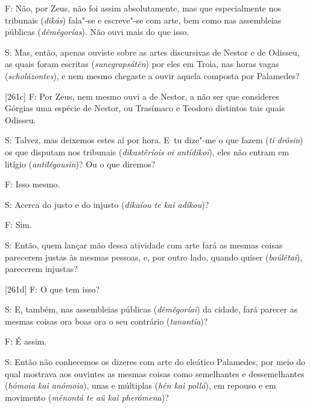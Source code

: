  

F: Não, por Zeus, não foi assim absolutamente, mas que especialmente nos
tribunais (\emph{dikás}) fala"-se e escreve"-se com arte, bem como nas
assembleias públicas (\emph{dêmêgorías}). Não ouvi mais do que isso.

 

S: Mas, então, apenas ouviste sobre as artes discursivas de Nestor e de
Odisseu, as quais foram escritas (\emph{sunegrapsátên}) por eles em
Troia, nas horas vagas (\emph{scholázontes}), e nem mesmo chegaste a
ouvir aquela composta por Palamedes?

 

[261c] F: Por Zeus, nem mesmo ouvi a de Nestor, a não ser que
consideres Górgias uma espécie de Nestor, ou Trasímaco e Teodoro
distintos tais quais Odisseu.

 

S: Talvez, mas deixemos estes aí por hora. E~tu dize"-me o que fazem
(\emph{tí drôsin}) os que disputam nos tribunais (\emph{dikastêríois oi
antídikoi}), eles não entram em litígio (\emph{antilégousin})? Ou o que
diremos?

 

F: Isso mesmo.

 

S: Acerca do justo e do injusto (\emph{dikaíou te kaì adíkou})?

 

F: Sim.

 

S: Então, quem lançar mão dessa atividade com arte fará as mesmas coisas
parecerem justas às mesmas pessoas, e, por outro lado, quando quiser
(\emph{boúlêtai}), parecerem injustas?

 

[261d] F: O que tem isso?

 

S: E, também, nas assembleias públicas (\emph{dêmêgoríai}) da cidade,
fará parecer as mesmas coisas ora boas ora o seu contrário
(\emph{tanantía})?

 

F: É assim.

 

S: Então não conhecemos os dizeres com arte do eleático Palamedes, por
meio do qual mostrava aos ouvintes as mesmas coisas como semelhantes e
dessemelhantes (\emph{hómoia kaì anómoia}), unas e múltiplas (\emph{hén
kaì pollá}), em repouso e em movimento (\emph{ménontá te aû kaì
pherómena})?

 

